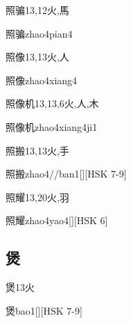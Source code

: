 \begin{Entry}{照骗}{13,12}{⽕,⾺}
  \begin{Phonetics}{照骗}{zhao4pian4}
  \end{Phonetics}
\end{Entry}

\begin{Entry}{照像}{13,13}{⽕,⼈}
  \begin{Phonetics}{照像}{zhao4xiang4}
  \end{Phonetics}
\end{Entry}

\begin{Entry}{照像机}{13,13,6}{⽕,⼈,⽊}
  \begin{Phonetics}{照像机}{zhao4xiang4ji1}
  \end{Phonetics}
\end{Entry}

\begin{Entry}{照搬}{13,13}{⽕,⼿}
  \begin{Phonetics}{照搬}{zhao4//ban1}[][HSK 7-9]
  \end{Phonetics}
\end{Entry}

\begin{Entry}{照耀}{13,20}{⽕,⽻}
  \begin{Phonetics}{照耀}{zhao4yao4}[][HSK 6]
  \end{Phonetics}
\end{Entry}

\subsection*{煲}

\begin{Entry}{煲}{13}{⽕}
  \begin{Phonetics}{煲}{bao1}[][HSK 7-9]
  \end{Phonetics}
\end{Entry}


